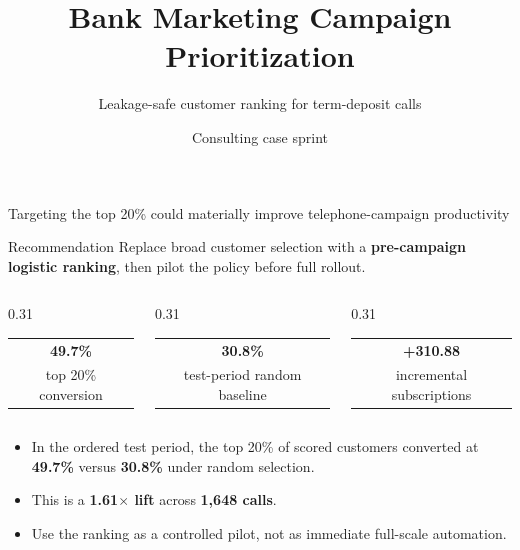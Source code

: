 \documentclass[aspectratio=169,11pt]{beamer}
\title[Bank Marketing Case]{Bank Marketing Campaign Prioritization}
\subtitle{Leakage-safe customer ranking for term-deposit calls}
\author{Consulting case sprint}
\date{}
\newcommand{\metric}[2]{\begin{tabular}{c}\Large\textbf{#1}\\[-0.2em]{\scriptsize #2}\end{tabular}}
\newcommand{\tightitem}{\setlength\itemsep{0.25em}}
\begin{document}
\begin{frame}{Targeting the top 20\% could materially improve telephone-campaign productivity}
\vspace{-0.2em}
\begin{block}{Recommendation}
Replace broad customer selection with a \textbf{pre-campaign logistic ranking}, then pilot the policy before full rollout.
\end{block}

\vspace{0.7em}
\begin{columns}[T,totalwidth=\textwidth]
\begin{column}{0.31\textwidth}
\centering
\metric{49.7\%}{top 20\% conversion}
\end{column}
\begin{column}{0.31\textwidth}
\centering
\metric{30.8\%}{test-period random baseline}
\end{column}
\begin{column}{0.31\textwidth}
\centering
\metric{+310.88}{incremental subscriptions}
\end{column}
\end{columns}

\vspace{1.0em}
\begin{itemize}\tightitem
  \item In the ordered test period, the top 20\% of scored customers converted at \textbf{49.7\%} versus \textbf{30.8\%} under random selection.
  \item This is a \textbf{1.61$\times$ lift} across \textbf{1,648 calls}.
  \item Use the ranking as a controlled pilot, not as immediate full-scale automation.
\end{itemize}
\end{frame}
\end{document}
